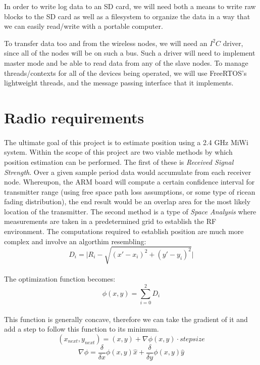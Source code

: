 \documentclass{article}
\begin{document}
In order to write log data to an SD card, we will need both a means to write raw
blocks to the SD card as well as a filesystem to organize the data in a way that
we can easily read/write with a portable computer. 

To transfer data too and from the wireless nodes, we will need an $I^2C$ driver,
since all of the nodes will be on such a bus.  Such a driver will need to
implement master mode and be able to read data from any of the slave nodes.  To
manage threads/contexts for all of the devices being operated, we will use
FreeRTOS's lightweight threads, and the message passing interface that it
implements.

\section*{Radio requirements}
\paragraph*{}
The ultimate goal of this project is to estimate position using a 2.4 GHz MiWi system.  Within the scope of this project are two viable methods by which position estimation can be performed.  The first of these is \textit{Received Signal Strength}.  Over a given sample period data would accumulate from each receiver node.  Whereupon, the ARM board will compute a certain confidence interval for transmitter range (using free space path loss assumptions, or some type of ricean fading distribution), the end result would be an overlap area for the most likely location of the transmitter.  The second method is a type of \textit{Space Analysis} where measurements are taken in a predetermined grid to establish the RF environment.  The computations required to establish position are much more complex and involve an algorthim resembling:
\begin{equation}
D_{i} = \vert R_{i} - \sqrt{ \left( x' - x_{i} \right)^{2} +\left( y' - y_{i} \right)^{2} } \vert
\end{equation}
\paragraph*{}The optimization function becomes:
\begin{equation}
\phi\left(x,y\right) = \sum_{i=0}^{2}D_{i}
\end{equation}
\paragraph*{}This function is generally concave, therefore we can take the gradient of it and add a step to follow this function to its minimum.
\begin{equation}
\left(x_{next},y_{next}\right) = (x,y) + \nabla\phi\left(x,y\right)\cdot stepsize
\end{equation}
\begin{equation}
\nabla\phi = \frac{\delta}{\delta x}\phi\left(x,y\right)\hat{x} + \frac{\delta}{\delta y}\phi\left(x,y\right)\hat{y}
\end{equation}
\end{document}
